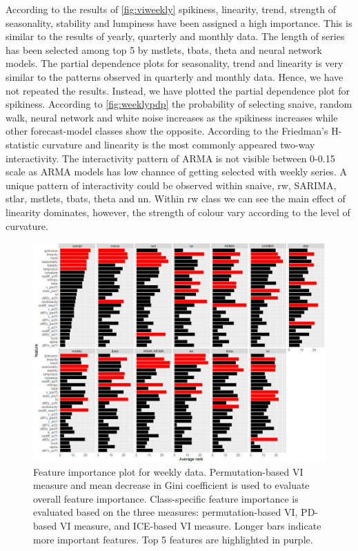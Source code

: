 \documentclass[11pt,a4paper,]{article}
\begin{document}
According to the results of \autoref{fig:viweekly} spikiness, linearity, trend, strength of seasonality, stability and lumpiness have been assigned a high importance. This is similar to the results of yearly, quarterly and monthly data. The length of series has been selected among top 5 by mstlets, tbats, theta and neural network models. The partial dependence plots for seasonality, trend and linearity is very similar to the patterns observed in quarterly and monthly data. Hence, we have not repeated the results. Instead, we have plotted the partial dependence plot for spikiness. According to \autoref{fig:weeklypdp} the probability of selecting snaive, random walk, neural network and white noise increases as the spikiness increases while other forecast-model classes show the opposite. According to the Friedman's H-statistic curvature and linearity is the most commonly appeared two-way interactivity. The interactivity pattern of ARMA is not visible between 0-0.15 scale as ARMA models has low channce of getting selected with weekly series. A unique pattern of interactivity could be observed within snaive, rw, SARIMA, stlar, mstlets, tbats, theta and nn. Within rw class we can see the main effect of linearity dominates, however, the strength of colour vary according to the level of curvature.

\begin{figure}[h]

{\centering \includegraphics{figures/viweekly-1} 

}

\caption{Feature importance plot for weekly data. Permutation-based VI measure and mean decrease in Gini coefficient is used to evaluate overall feature importance. Class-specific feature importance is evaluated based on the three measures: permutation-based VI, PD-based VI measure, and ICE-based VI measure. Longer bars indicate more important features. Top 5 features are highlighted in purple.}\label{fig:viweekly}
\end{figure}
\end{document}
